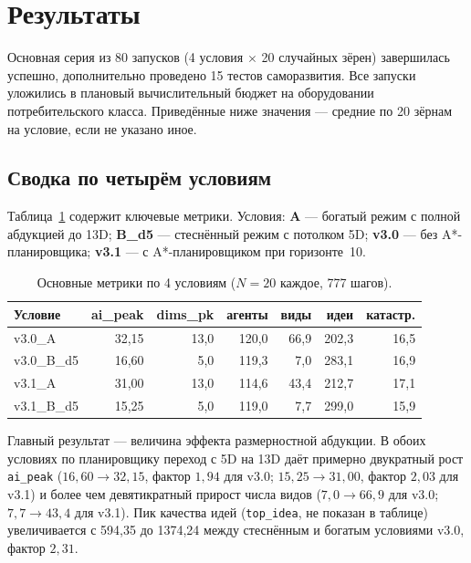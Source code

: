 \documentclass[11pt,a4paper]{article}
\begin{document}
\section{Результаты}
\label{sec:results}

Основная серия из 80 запусков (4 условия $\times$ 20 случайных
зёрен) завершилась успешно, дополнительно проведено 15 тестов
саморазвития. Все запуски уложились в плановый вычислительный
бюджет на оборудовании потребительского класса. Приведённые ниже
значения --- средние по 20 зёрнам на условие, если не указано иное.

\subsection{Сводка по четырём условиям}

Таблица~\ref{tab:main-ru} содержит ключевые метрики. Условия:
\textbf{A} --- богатый режим с полной абдукцией до 13D;
\textbf{B\_d5} --- стеснённый режим с потолком 5D;
\textbf{v3.0} --- без A*-планировщика; \textbf{v3.1} --- с
A*-планировщиком при горизонте~10.

\begin{table}[h]
\centering
\caption{Основные метрики по 4 условиям ($N=20$ каждое, 777 шагов).}
\label{tab:main-ru}
\small
\begin{tabular}{lrrrrrr}
\toprule
Условие & ai\_peak & dims\_pk & агенты & виды & идеи & катастр. \\
\midrule
v3.0\_A     & 32{,}15 & 13{,}0 & 120{,}0 & 66{,}9 & 202{,}3 & 16{,}5 \\
v3.0\_B\_d5 & 16{,}60 &  5{,}0 & 119{,}3 &  7{,}0 & 283{,}1 & 16{,}9 \\
v3.1\_A     & 31{,}00 & 13{,}0 & 114{,}6 & 43{,}4 & 212{,}7 & 17{,}1 \\
v3.1\_B\_d5 & 15{,}25 &  5{,}0 & 119{,}0 &  7{,}7 & 299{,}0 & 15{,}9 \\
\bottomrule
\end{tabular}
\end{table}

Главный результат --- величина эффекта размерностной абдукции.
В обоих условиях по планировщику переход с 5D на 13D даёт
примерно двукратный рост \texttt{ai\_peak}
($16{,}60 \rightarrow 32{,}15$, фактор $1{,}94$ для v3.0;
$15{,}25 \rightarrow 31{,}00$, фактор $2{,}03$ для v3.1) и более
чем девятикратный прирост числа видов
($7{,}0 \rightarrow 66{,}9$ для v3.0; $7{,}7 \rightarrow 43{,}4$
для v3.1). Пик качества идей (\texttt{top\_idea}, не показан
в таблице) увеличивается с 594{,}35 до 1374{,}24 между
стеснённым и богатым условиями v3.0, фактор $2{,}31$.
\end{document}
